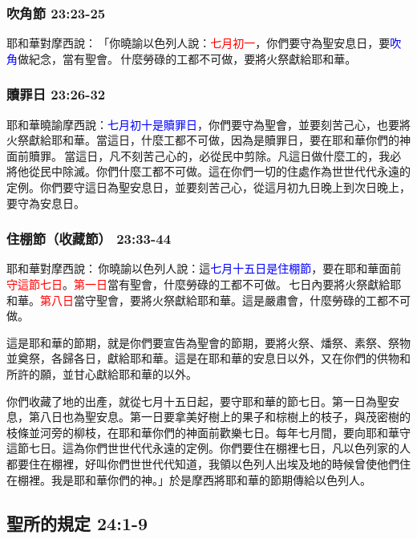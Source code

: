 \subsubsection{吹角節 23:23-25}
耶和華對摩西說： 「你曉諭以色列人說：\textcolor{red}{七月初一}，你們要守為聖安息日，要\textcolor{blue}{吹角}做紀念，當有聖會。 什麼勞碌的工都不可做，要將火祭獻給耶和華。

\subsubsection{贖罪日 23:26-32}
耶和華曉諭摩西說：\textcolor{blue}{七月初十是贖罪日}，你們要守為聖會，並要刻苦己心，也要將火祭獻給耶和華。當這日，什麼工都不可做，因為是贖罪日，要在耶和華你們的神面前贖罪。 當這日，凡不刻苦己心的，必從民中剪除。凡這日做什麼工的，我必將他從民中除滅。你們什麼工都不可做。這在你們一切的住處作為世世代代永遠的定例。你們要守這日為聖安息日，並要刻苦己心，從這月初九日晚上到次日晚上，要守為安息日。

\subsubsection{住棚節（收藏節） 23:33-44}
耶和華對摩西說： 你曉諭以色列人說：這\textcolor{blue}{七月十五日是住棚節}，要在耶和華面前\textcolor{red}{守這節七日}。\textcolor{red}{第一日}當有聖會，什麼勞碌的工都不可做。 七日內要將火祭獻給耶和華。\textcolor{red}{第八日}當守聖會，要將火祭獻給耶和華。這是嚴肅會，什麼勞碌的工都不可做。

這是耶和華的節期，就是你們要宣告為聖會的節期，要將火祭、燔祭、素祭、祭物並奠祭，各歸各日，獻給耶和華。這是在耶和華的安息日以外，又在你們的供物和所許的願，並甘心獻給耶和華的以外。

你們收藏了地的出產，就從七月十五日起，要守耶和華的節七日。第一日為聖安息，第八日也為聖安息。第一日要拿美好樹上的果子和棕樹上的枝子，與茂密樹的枝條並河旁的柳枝，在耶和華你們的神面前歡樂七日。每年七月間，要向耶和華守這節七日。這為你們世世代代永遠的定例。你們要住在棚裡七日，凡以色列家的人都要住在棚裡，好叫你們世世代代知道，我領以色列人出埃及地的時候曾使他們住在棚裡。我是耶和華你們的神。」於是摩西將耶和華的節期傳給以色列人。


\subsection{聖所的規定 24:1-9}
\noindent
